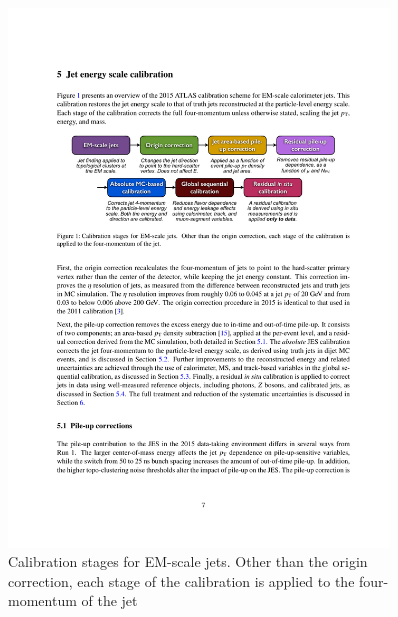 \begin{figure}[!htb]
  \begin{center}
    \includegraphics[width=0.9\textwidth]{figs/Objects/jets_calib_schem.pdf}
    \caption[Calibration stages for EM-scale jets. Other than the origin correction, each stage of the calibration is applied to the four-momentum of the jet.]
            {Calibration stages for EM-scale jets. Other than the origin correction, each stage of the calibration is applied to the four-momentum of the jet~\cite{obj-jets_calib_run2}}
    \label{fig:obj-jets_calib_schem}
  \end{center}
  \vspace{-0.5cm}
\end{figure}

